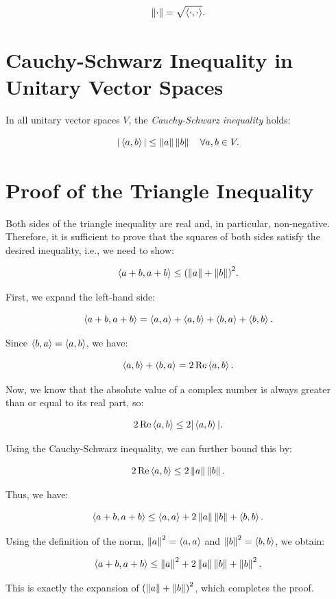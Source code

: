 \[
    \left\| \cdot \right\| = \sqrt{\langle \cdot, \cdot \rangle}.
\]

\section{Cauchy-Schwarz Inequality in Unitary Vector Spaces}

In all unitary vector spaces \( V \), the \emph{Cauchy-Schwarz inequality} holds:

\[
    | \left\langle a, b\right\rangle | \leq \left\| a \right\| \left\| b \right\| \quad \forall a, b \in V.
\]

\section{Proof of the Triangle Inequality}

Both sides of the triangle inequality are real and, in particular, non-negative. Therefore, it is sufficient to prove that the squares 
of both sides satisfy the desired inequality, i.e., we need to show:

\[
    \left\langle a + b, a + b\right\rangle \leq {(\left\| a \right\| + \left\| b \right\|)}^2.
\]

First, we expand the left-hand side:

\[
    \left\langle a + b, a + b\right\rangle = \left\langle a, a\right\rangle + \left\langle a, b\right\rangle + \left\langle b, a\right\rangle + 
    \left\langle b, b\right\rangle.
\]

Since \( \left\langle b, a\right\rangle = \left\langle a, b\right\rangle \), we have:

\[
    \left\langle a, b\right\rangle + \left\langle b, a\right\rangle = 2 \, \text{Re} \left\langle a, b\right\rangle.
\]

Now, we know that the absolute value of a complex number is always greater than or equal to its 
real part, so:

\[
    2 \, \text{Re} \left\langle a, b\right\rangle \leq 2 |\left\langle a, b\right\rangle|.
\]

Using the Cauchy-Schwarz inequality, we can further bound this by:

\[
    2 \, \text{Re} \left\langle a, b\right\rangle \leq 2 \left\| a \right\| \left\| b \right\|.
\]

Thus, we have:

\[
    \left\langle a + b, a + b\right\rangle \leq \left\langle a, a\right\rangle + 2 \left\| a \right\| \left\| b \right\| + \left\langle b, b\right\rangle.
\]

Using the definition of the norm, \( \left\| a \right\|^2 = \left\langle a, a\right\rangle \) and \( \left\| b \right\|^2 = \langle b, b 
\rangle \), we obtain:

\[
    \left\langle a + b, a + b\right\rangle \leq \left\| a \right\|^2 + 2 \left\| a \right\| \left\| b \right\| + \left\| b \right\|^2.
\]

This is exactly the expansion of \( {(\left\| a \right\| + \left\| b \right\|)}^2 \), which completes the proof.

